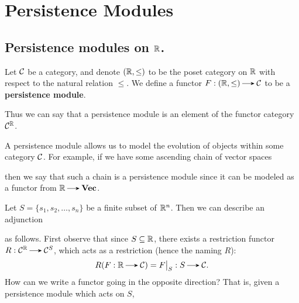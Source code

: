 \chapter{Persistence Modules}

\section{Persistence modules on $\mathbb{R}$.}
\begin{definition}
    Let $\mathcal{C}$ be a category, and denote $(\mathbb{R}, \le)$
    to be the poset category on $\mathbb{R}$ with respect to the natural relation 
    $\le$. We define a functor $F: (\rr, \le) \to \cc$ 
    to be a \textbf{persistence module}. 
\end{definition}

Thus we can say that a persistence module is an element of the functor 
category $\mathcal{C}^{\mathbb{R}}$. 

A persistence module allows us to model the evolution of objects within some 
category $\mathcal{C}$. For example, if we have some ascending chain of vector spaces 
\begin{center}
\end{center}
then we say that such a chain is a persistence module since it can 
be modeled as a functor from $\rr \to \textbf{Vec}$.  

Let $S = \{s_1, s_2, \dots, s_n\}$ be a finite subset of $\mathbb{R}^n$. Then we can describe  
an adjunction  
\begin{center}
\end{center}
as follows. First observe that since $S \subseteq \mathbb{R}$, there exists
a restriction functor 
$R: \cc^{\rr} \to \cc^{S}$, which acts as a restriction (hence the naming $R$): 
\[
    R(F: \rr \to \cc) = F\big|_{S}: S \to \cc.
\]  
How can we write a functor going in the opposite direction? That is, given a
persistence module which acts on $S$, 

